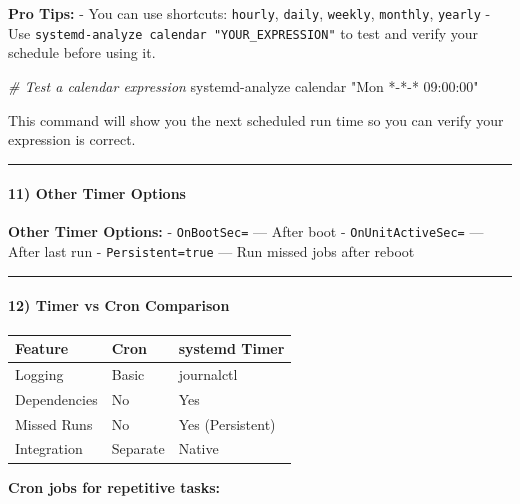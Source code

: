 \documentclass[
  english,
  paper=a4,
  oneside  ,captions=tableheading
]{scrartcl}
\newenvironment{Shaded}{}{}
\newcommand{\CommentTok}[1]{\textcolor[rgb]{0.38,0.63,0.69}{\textit{#1}}}
\newcommand{\ExtensionTok}[1]{#1}
\newcommand{\NormalTok}[1]{#1}
\newcommand{\StringTok}[1]{\textcolor[rgb]{0.25,0.44,0.63}{#1}}
\newcounter{none} %
\begin{document}
\textbf{Pro Tips:} - You can use shortcuts: \texttt{hourly},
\texttt{daily}, \texttt{weekly}, \texttt{monthly}, \texttt{yearly} - Use
\texttt{systemd-analyze\ calendar\ "YOUR\_EXPRESSION"} to test and
verify your schedule before using it.

\begin{Shaded}
\begin{Highlighting}[]
\CommentTok{\# Test a calendar expression}
\ExtensionTok{systemd{-}analyze}\NormalTok{ calendar }\StringTok{"Mon *{-}*{-}* 09:00:00"}
\end{Highlighting}
\end{Shaded}

This command will show you the next scheduled run time so you can verify
your expression is correct.

\begin{center}\rule{0.5\linewidth}{0.5pt}\end{center}

\paragraph{11) Other Timer Options}\label{other-timer-options}

\textbf{Other Timer Options:} - \texttt{OnBootSec=} --- After boot -
\texttt{OnUnitActiveSec=} --- After last run - \texttt{Persistent=true}
--- Run missed jobs after reboot

\begin{center}\rule{0.5\linewidth}{0.5pt}\end{center}

\paragraph{12) Timer vs Cron Comparison}\label{timer-vs-cron-comparison}

{\def\LTcaptype{none} %
\begin{longtable}[]{@{}lll@{}}
\toprule\noalign{}
Feature & Cron & systemd Timer \\
\midrule\noalign{}
\endhead
\bottomrule\noalign{}
\endlastfoot
Logging & Basic & journalctl \\
Dependencies & No & Yes \\
Missed Runs & No & Yes (Persistent) \\
Integration & Separate & Native \\
\end{longtable}
}

\textbf{Cron jobs for repetitive tasks:}
\end{document}
